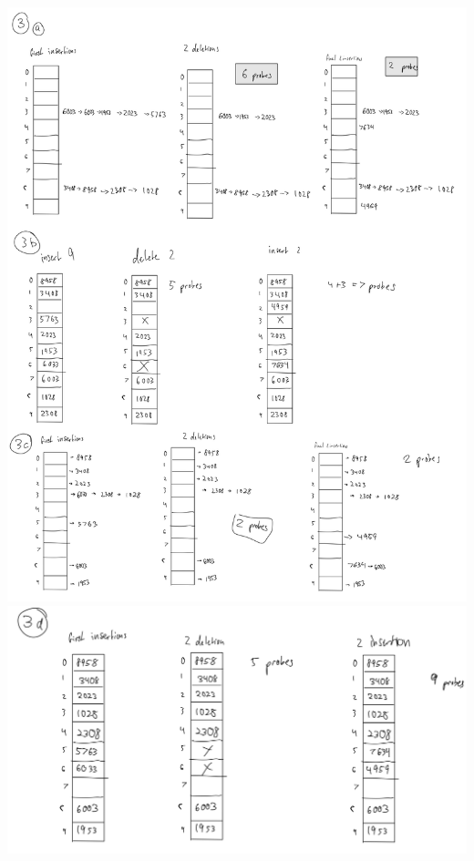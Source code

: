 \documentclass[11pt,largemargins]{homework}
\begin{document}
\newpage
\hspace{-5em}
\includegraphics[width=1.3\textwidth]{pictures/hw3/q3abc.jpg}
\newpage
\hspace{-5em}
\includegraphics[width=1.3\textwidth]{pictures/hw3/q3d.jpeg}


\newpage
\setcounter{questionCounter}{3}
\question
\end{document}
